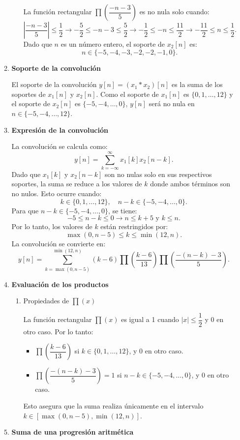 \begin{enumerate}[label=\color{red}\textbf{\arabic*)}]
\begin{enumerate}[label=\textbf{\arabic*)}]
\begin{enumerate}[label=\alph*)]
                La función rectangular $\prod\left( \dfrac{-n-3}{5} \right) $ es no nula solo cuando: \[
                \left| \dfrac{-n-3}{5} \right| \le \dfrac{1}{2}\longrightarrow -\dfrac{5}{2}\le -n-3\le \dfrac{5}{2}\longrightarrow -\dfrac{1}{2}\le -n\le \dfrac{11}{2}\longrightarrow -\dfrac{11}{2}\le n\le \dfrac{1}{2}.
                \] 
                Dado que $n$ es un número entero, el soporte de $x_2[n]$ es: \[
                n\in \{-5,-4,-3,-2,-2,-1,0\}. 
                \] 
        \end{enumerate}
    \item \textbf{Soporte de la convolución}

        El soporte de la convolución $y[n]=(x_1\ast x_2)[n]$ es la suma de los soportes de $x_1[n]$ y $x_2[n]$. Como el soporte de $x_1[n]$ es $\{0,1,\dots,12\} $ y el soporte de $x_2[n]$ es $\{-5,-4,\dots,0\} $, $y[n]$ será no nula en  $n\in \{-5,-4,\dots,12\} $.

    \item \textbf{Expresión de la convolución}

        La convolución se calcula como: \[
            y[n]=\sum_{k=-\infty}^{\infty} x_1[k]x_2[n-k].
        \] 
        Dado que $x_1[k]$ y $x_2[n-k]$ son no nulas solo en sus respectivos soportes, la suma se reduce a los valores de $k$ donde ambos términos son no nulos. Esto ocurre cuando: \[
        k\in \{0,1,\dots,12\} ,\quad n-k\in \{-5,-4,\dots,0\} .
        \] 
        Para que $n-k\in \{-5,-4,\dots,0\} $, se tiene: \[
        -5\le n-k\le 0\longrightarrow n\le k+5\text{ y }k\le n.
        \] 
        Por lo tanto, los valores de $k$ están restringidos por: \[
        \max(0,n-5)\le k\le \min(12,n).
        \] 
        La convolución se convierte en: \[
            y[n]=\sum_{k=\max(0,n-5)}^{\min(12,n)} (k-6)\prod\left( \dfrac{k-6}{13} \right) \prod\left( \dfrac{-(n-k)-3}{5} \right) .
        \] 
    \item \textbf{Evaluación de los productos}
        \begin{enumerate}[label=\alph*)]
            \item Propiedades de $\prod(x)$

                La función rectangular  $\prod(x)$ es igual a 1 cuando  $|x|\le \dfrac{1}{2}$ y 0 en otro caso. Por lo tanto:
                \begin{itemize}[label=\textbullet]
                    \item $\prod\left( \dfrac{k-6}{13} \right) $ si $k\in \{0,1,\dots,12\} $, y $0$ en otro caso.
                    \item  $\prod\left( \dfrac{-(n-k)-3}{5} \right) =1$ si $n-k\in \{-5,-4,\dots,0\} $, y 0 en otro caso.
                \end{itemize}
                Esto asegura que la suma realiza únicamente en el intervalo $k\in [\max(0,n-5),\min(12,n)]$.
        \end{enumerate}
    \item \textbf{Suma de una progresión aritmética} 


\end{enumerate}
\end{enumerate}
